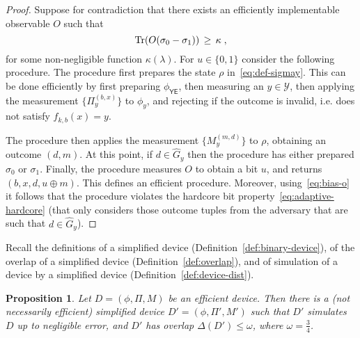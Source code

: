 \documentclass[11pt]{article}
\newtheorem{proposition}[theorem]{Proposition}
\theoremstyle{remark}
\theoremstyle{definition}
\newcommand{\Tr}{\mbox{\rm Tr}}
\newcommand{\reg}[1]{{\textsf{#1}}}
\newcommand{\mY}{\ensuremath{\mathcal{Y}}}
\newcommand{\dset}{G}
\begin{document}
\begin{proof}
Suppose for contradiction that there exists an efficiently implementable observable $O$ such that 
\begin{equation}\label{eq:bias-o}
\Tr(O(\sigma_0-\sigma_1)) \,\geq\, \kappa\;,
\end{equation}
 for some non-negligible function $\kappa(\lambda)$. For $u\in\{0,1\}$ consider the following procedure. The procedure first prepares the state $\rho$ in~\eqref{eq:def-sigmay}. This can be done efficiently by first preparing $\phi_{\reg{YE}}$, then measuring an $y\in \mY$, then applying the measurement $\{\Pi_y^{(b,x)}\}$ to $\phi_y$, and rejecting if the outcome is invalid, i.e. does not satisfy $f_{k,b}(x)=y$. 

The procedure then applies the measurement $\{M_y^{(m,d)}\}$ to $\rho$, obtaining an outcome $(d,m)$. At this point, if $d\in \hat{\dset}_{y}$ then the procedure has either prepared $\sigma_0$ or $\sigma_1$. Finally, the procedure  measures $O$ to obtain a bit $u$, and returns $(b,x,d,u\oplus m)$. This defines an efficient procedure. Moreover, using~\eqref{eq:bias-o} it follows  that the procedure violates the hardcore bit property~\eqref{eq:adaptive-hardcore} (that only considers those outcome tuples from the adversary that are such that $d\in\hat{\dset}_{y}$). 
\end{proof}

Recall the definitions of a simplified device (Definition~\ref{def:binary-device}), of the overlap of a simplified device (Definition~\ref{def:overlap}), and of simulation of a device by a simplified device (Definition~\ref{def:device-dist}). 

\begin{proposition}\label{prop:change-d}
Let $D=(\phi,\Pi,M)$ be an efficient device. Then there is a (not necessarily efficient) simplified device $D'=(\phi,\Pi',M')$ such that $D'$ simulates $D$ up to negligible error, and $D'$ has overlap $\Delta(D') \leq \omega$, where $\omega = \frac{3}{4}$.
\end{proposition}
\end{document}
